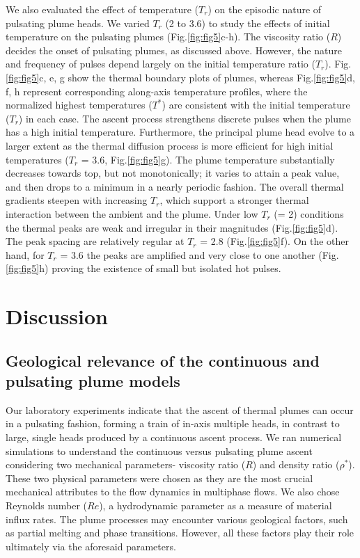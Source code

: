 \documentclass[12pt]{article}
\begin{document}
{We also evaluated the effect of temperature ($T_r$) on the episodic nature of pulsating plume heads. We varied $T_r$ (2 to 3.6) to study the effects of initial temperature on the pulsating 
plumes (Fig.\ref{fig:fig5}c-h). The viscosity ratio ($R$) decides the onset of pulsating plumes, 
as discussed above. However, the nature and frequency of pulses depend largely on the initial temperature ratio ($T_r$). Fig.\ref{fig:fig5}c, e, g show the thermal boundary plots of plumes, 
whereas Fig.\ref{fig:fig5}d, f, h represent corresponding along-axis temperature profiles, where the normalized highest temperatures ($T^*$) are consistent with the initial temperature ($T_r$) 
in each case. The ascent process strengthens discrete pulses when the plume has a high initial temperature. Furthermore, the principal plume head evolve to a larger extent as the thermal diffusion
process is more efficient for high initial temperatures ($T_r$ = 3.6, Fig.\ref{fig:fig5}g). The plume temperature substantially decreases towards top, but not monotonically; it varies to attain a peak value, and then drops to a minimum in a nearly periodic fashion. The overall thermal gradients steepen with 
increasing $T_r$, which support a stronger thermal interaction between the ambient and the plume. Under low $T_r$ (= 2) conditions the thermal peaks are weak and irregular in their magnitudes (Fig.\ref{fig:fig5}d). The peak spacing are relatively regular at $T_r$ = 2.8 (Fig.\ref{fig:fig5}f). On the other hand, for $T_r$ = 3.6 the peaks are amplified and very close to one another (Fig.\ref{fig:fig5}h) proving the existence of small but isolated hot pulses. 

\section{Discussion}
\label{sec:disscussions} 

\subsection{Geological relevance of the continuous and pulsating plume models}
\label{sec:geo_rel}

Our laboratory experiments indicate that the ascent of thermal plumes can occur in a pulsating fashion, forming a train of in-axis multiple heads, in contrast to large, single heads produced by a continuous ascent process. We ran numerical simulations to understand the continuous versus pulsating plume ascent considering two mechanical parameters- viscosity ratio ($R$) and density ratio ($\rho^*$). These two physical parameters were chosen as they are the most crucial mechanical attributes to the flow dynamics in multiphase flows. We also chose Reynolds number ($Re$), a hydrodynamic parameter as a measure of material influx rates. The plume processes may encounter various geological factors, such as partial melting and phase transitions. However, all these factors play their role ultimately via the aforesaid parameters. 


}
\end{document}
